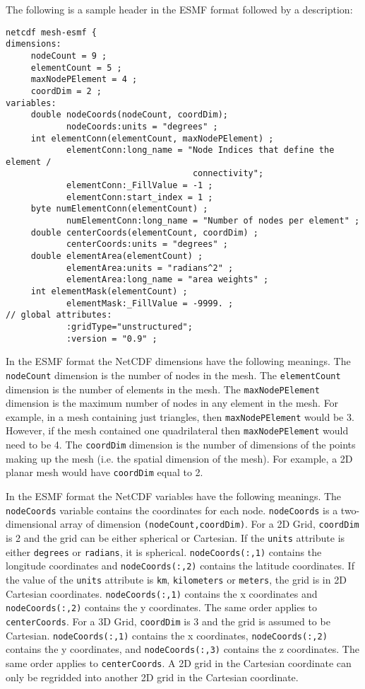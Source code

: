 The following is a sample header in the ESMF format followed by a description:

\begin{verbatim}
netcdf mesh-esmf {
dimensions:
     nodeCount = 9 ;
     elementCount = 5 ;
     maxNodePElement = 4 ;
     coordDim = 2 ;
variables:
     double nodeCoords(nodeCount, coordDim);
            nodeCoords:units = "degrees" ;
     int elementConn(elementCount, maxNodePElement) ;
            elementConn:long_name = "Node Indices that define the element /
                                     connectivity";
            elementConn:_FillValue = -1 ;
            elementConn:start_index = 1 ;
     byte numElementConn(elementCount) ;
            numElementConn:long_name = "Number of nodes per element" ;
     double centerCoords(elementCount, coordDim) ;
            centerCoords:units = "degrees" ;
     double elementArea(elementCount) ;
            elementArea:units = "radians^2" ;
            elementArea:long_name = "area weights" ;
     int elementMask(elementCount) ;
            elementMask:_FillValue = -9999. ;
// global attributes:
            :gridType="unstructured";
            :version = "0.9" ;
\end{verbatim}

 In the ESMF format the NetCDF dimensions have the following meanings. The {\tt nodeCount} dimension is the number of nodes in the mesh.
 The {\tt elementCount} dimension is the number of elements in the mesh. The {\tt maxNodePElement} dimension is the maximum number
 of nodes in any element in the mesh. For example, in a mesh containing just triangles, then {\tt maxNodePElement} would be 3. However,
 if the mesh contained one quadrilateral then {\tt maxNodePElement} would need to be 4. The {\tt coordDim} dimension is the number of dimensions
 of the points making up the mesh (i.e. the spatial dimension of the mesh). For example, a 2D planar mesh would have {\tt coordDim} equal to 2.  

 In the ESMF format the NetCDF variables have the following meanings. The {\tt nodeCoords} variable contains the coordinates for each node.
 {\tt nodeCoords} is a two-dimensional array of dimension {\tt (nodeCount,coordDim)}.
 For a 2D Grid, {\tt coordDim} is 2 and the grid can be either spherical or Cartesian. If the {\tt units}
 attribute is either {\tt degrees} or {\tt radians}, it is spherical. {\tt nodeCoords(:,1)} contains 
the longitude coordinates and {\tt nodeCoords(:,2)} contains the latitude coordinates.  If the value of 
the {\tt units} attribute is {\tt km}, {\tt kilometers} or {\tt meters}, the grid is in 2D Cartesian 
coordinates. {\tt nodeCoords(:,1)} contains the x coordinates and
 {\tt nodeCoords(:,2)} contains the y coordinates.
 The same order applies to {\tt centerCoords}.
 For a 3D Grid, {\tt coordDim} is 3 and the grid is assumed to be Cartesian. {\tt nodeCoords(:,1)} contains the x coordinates, {\tt nodeCoords(:,2)} contains the y coordinates, 
 and {\tt nodeCoords(:,3)} contains the z coordinates.  The same order applies to {\tt centerCoords}.
A 2D grid in the Cartesian coordinate can only be regridded into another 2D grid in the Cartesian coordinate.
 
